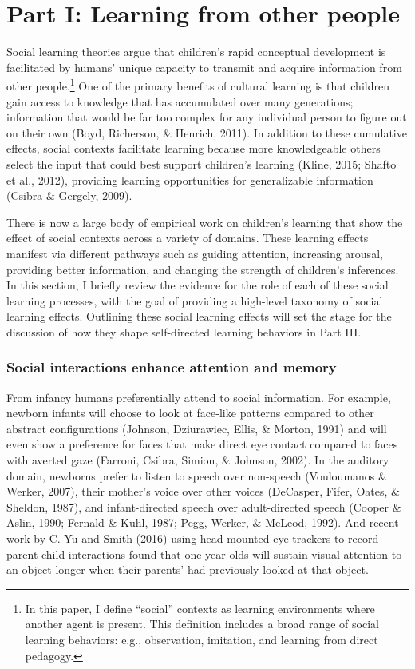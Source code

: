 \documentclass[english,man]{apa6}
\theoremstyle{definition}
\theoremstyle{definition}
\theoremstyle{definition}
\theoremstyle{remark}
\begin{document}
\section{Part I: Learning from other
people}\label{part-i-learning-from-other-people}

Social learning theories argue that children's rapid conceptual
development is facilitated by humans' unique capacity to transmit and
acquire information from other people.\footnote{In this paper, I define
  \enquote{social} contexts as learning environments where another agent
  is present. This definition includes a broad range of social learning
  behaviors: e.g., observation, imitation, and learning from direct
  pedagogy.} One of the primary benefits of cultural learning is that
children gain access to knowledge that has accumulated over many
generations; information that would be far too complex for any
individual person to figure out on their own (Boyd, Richerson, \&
Henrich, 2011). In addition to these cumulative effects, social contexts
facilitate learning because more knowledgeable others select the input
that could best support children's learning (Kline, 2015; Shafto et al.,
2012), providing learning opportunities for generalizable information
(Csibra \& Gergely, 2009).

There is now a large body of empirical work on children's learning that
show the effect of social contexts across a variety of domains. These
learning effects manifest via different pathways such as guiding
attention, increasing arousal, providing better information, and
changing the strength of children's inferences. In this section, I
briefly review the evidence for the role of each of these social
learning processes, with the goal of providing a high-level taxonomy of
social learning effects. Outlining these social learning effects will
set the stage for the discussion of how they shape self-directed
learning behaviors in Part III.

\subsubsection{Social interactions enhance attention and
memory}\label{social-interactions-enhance-attention-and-memory}

From infancy humans preferentially attend to social information. For
example, newborn infants will choose to look at face-like patterns
compared to other abstract configurations (Johnson, Dziurawiec, Ellis,
\& Morton, 1991) and will even show a preference for faces that make
direct eye contact compared to faces with averted gaze (Farroni, Csibra,
Simion, \& Johnson, 2002). In the auditory domain, newborns prefer to
listen to speech over non-speech (Vouloumanos \& Werker, 2007), their
mother's voice over other voices (DeCasper, Fifer, Oates, \& Sheldon,
1987), and infant-directed speech over adult-directed speech (Cooper \&
Aslin, 1990; Fernald \& Kuhl, 1987; Pegg, Werker, \& McLeod, 1992). And
recent work by C. Yu and Smith (2016) using head-mounted eye trackers to
record parent-child interactions found that one-year-olds will sustain
visual attention to an object longer when their parents' had previously
looked at that object.
\end{document}
